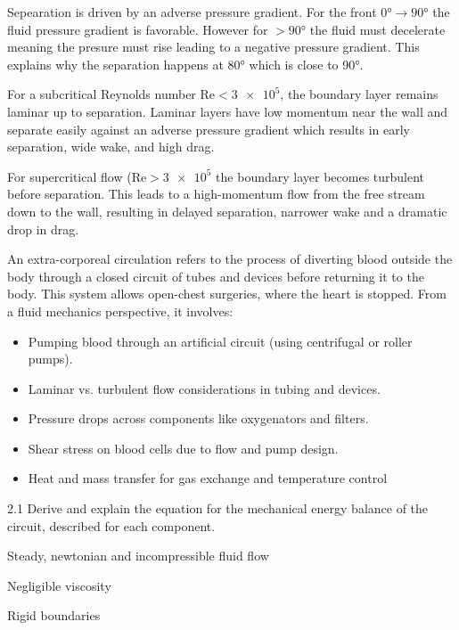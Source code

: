 \begin{derivation}
    Sepearation is driven by an adverse pressure gradient.
    For the front $\ang{0} \to \ang{90}$ the fluid pressure gradient is favorable.
    However for $> \ang{90}$ the fluid must decelerate meaning the presure must rise leading to a negative pressure gradient. This explains why the separation happens at \ang{80} which is close to \ang{90}.

    For a subcritical Reynolds number $\mathrm{Re} < \num{3e5}$, the boundary layer remains laminar up to separation. Laminar layers have low momentum near the wall and separate easily against an adverse pressure gradient which results in early separation, wide wake, and high drag.

    For supercritical flow ($\mathrm{Re}> \num{3e5}$ the boundary layer becomes turbulent before separation. This leads to a high-momentum flow from the free stream down to the wall, resulting in delayed separation, narrower wake and a dramatic drop in drag. 
  \end{derivation}

  \newpage

  An extra-corporeal circulation refers to the process of diverting blood outside the body through a closed circuit of tubes and devices before returning it to the body. This system allows open-chest surgeries, where the heart is stopped. From a fluid mechanics perspective, it involves: 
  \begin{itemize}
    \item Pumping blood through an artificial circuit (using centrifugal or roller pumps).
    \item Laminar vs. turbulent flow considerations in tubing and devices.
    \item Pressure drops across components like oxygenators and filters.
    \item Shear stress on blood cells due to flow and pump design.
    \item Heat and mass transfer for gas exchange and temperature control
  \end{itemize}
  
  \begin{problem}{2.1}
    Derive and explain the equation for the mechanical energy balance of the circuit, described for each component.
  \end{problem}

  \begin{assumptions}
    \item Steady, newtonian and incompressible fluid flow
    \item Negligible viscosity
    \item Rigid boundaries
  \end{assumptions}

